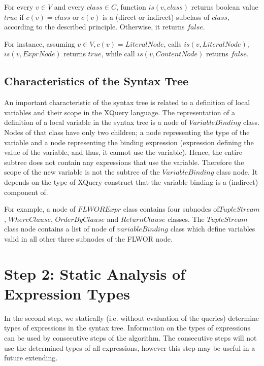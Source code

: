 \begin{define}For every $v \in V$ and every $class \in C$, function $is(v, class)$ returns boolean value $true$ if $c(v) = class$ or $c(v)$ is a (direct or indirect) subclass of $class$, according to the described principle. Otherwise, it returns $false$.
\end{define}

For instance, assuming $v \in V, c(v) = LiteralNode$, calls $is(v, LiteralNode)$, $is(v, ExprNode)$ returns $true$, while call $is(v, ContentNode)$ returns $false$.

\subsection{Characteristics of the Syntax Tree}
An important characteristic of the syntax tree is related to a definition of local variables and their scope in the XQuery language. The representation of a definition of a local variable in the syntax tree is a node of $VariableBinding$ class. Nodes of that class have only two children; a node representing the type of the variable and a node representing the binding expression (expression defining the value of the variable, and thus, it cannot use the variable). Hence, the entire subtree does not contain any expressions that use the variable. Therefore the scope of the new variable is not the subtree of the $VariableBinding$ class node. It depends on the type of XQuery construct that the variable binding is a (indirect) component of.

For example, a node of $FLWORExpr$ class contains four subnodes of\linebreak $TupleStream$, $WhereClause$, $OrderByClause$ and $ReturnClause$ classes. The $TupleStream$ class node contains a list of node of $variableBinding$ class which define variables valid in all other three subnodes of the FLWOR node.



\section{Step 2: Static Analysis of Expression Types}
In the second step, we statically (i.e. without evaluation of the queries) determine types of expressions in the syntax tree. Information on the types of expressions can be used by consecutive steps of the algorithm. The consecutive steps will not use the determined types of all expressions, however this step may be useful in a future extending.

